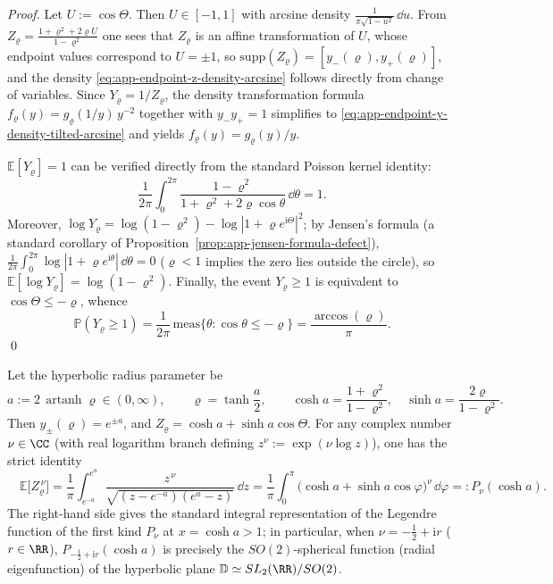 \begin{proof}
Let \(U:=\cos\Theta\). Then \(U\in[-1,1]\) with arcsine density
\(
\frac{1}{\pi\sqrt{1-u^{2}}}\,\dd u
\).
From \(Z_{\varrho}=\frac{1+\varrho^{2}+2\varrho U}{1-\varrho^{2}}\) one sees that \(Z_{\varrho}\) is an affine transformation of \(U\),
whose endpoint values correspond to \(U=\pm 1\), so \(\mathrm{supp}(Z_{\varrho})=[y_{-}(\varrho),y_{+}(\varrho)]\), and the density \eqref{eq:app-endpoint-z-density-arcsine} follows directly from change of variables.
Since \(Y_{\varrho}=1/Z_{\varrho}\), the density transformation formula \(f_{\varrho}(y)=g_{\varrho}(1/y)\,y^{-2}\) together with \(y_{-}y_{+}=1\) simplifies to \eqref{eq:app-endpoint-y-density-tilted-arcsine} and yields \(f_{\varrho}(y)=g_{\varrho}(y)/y\).
\par
\(\mathbb{E}[Y_{\varrho}]=1\) can be verified directly from the standard Poisson kernel identity:
\[
\frac{1}{2\pi}\int_{0}^{2\pi}\frac{1-\varrho^{2}}{1+\varrho^{2}+2\varrho\cos\theta}\,\dd\theta=1.
\]
Moreover,
\(
\log Y_{\varrho}
=\log(1-\varrho^{2})-\log|1+\varrho e^{\mathrm{i}\Theta}|^{2}
\);
by Jensen's formula (a standard corollary of Proposition~\ref{prop:app-jensen-formula-defect}),
\(
\frac{1}{2\pi}\int_{0}^{2\pi}\log|1+\varrho e^{\mathrm{i}\theta}|\,\dd\theta=0
\) (\(\varrho<1\) implies the zero lies outside the circle), so \(\mathbb{E}[\log Y_{\varrho}]=\log(1-\varrho^{2})\).
Finally, the event \(Y_{\varrho}\ge 1\) is equivalent to \(\cos\Theta\le -\varrho\), whence
\[
\mathbb{P}(Y_{\varrho}\ge 1)=\frac{1}{2\pi}\,\mathrm{meas}\{\theta:\cos\theta\le-\varrho\}
=\frac{\arccos(\varrho)}{\pi}.
\]
\qed
\end{proof}

\begin{theorem}\label{thm:app-legendre-moment-timefiber}
Let the hyperbolic radius parameter be
\[
a:=2\,\operatorname{artanh}\varrho\in(0,\infty),
\qquad
\varrho=\tanh\frac{a}{2},
\qquad
\cosh a=\frac{1+\varrho^{2}}{1-\varrho^{2}},
\quad
\sinh a=\frac{2\varrho}{1-\varrho^{2}}.
\]
Then \(y_{\pm}(\varrho)=e^{\pm a}\), and
\(
Z_{\varrho}=\cosh a+\sinh a\cos\Theta
\).
For any complex number \(\nu\in\CC\) (with real logarithm branch defining \(z^{\nu}:=\exp(\nu\log z)\)), one has the strict identity
\begin{equation}\label{eq:app-legendre-moment}
\boxed{\quad
\mathbb{E}\bigl[Z_{\varrho}^{\,\nu}\bigr]
=\frac{1}{\pi}\int_{e^{-a}}^{e^{a}}
\frac{z^{\,\nu}}{\sqrt{(z-e^{-a})(e^{a}-z)}}\,\dd z
=\frac{1}{\pi}\int_{0}^{\pi}\bigl(\cosh a+\sinh a\cos\varphi\bigr)^{\nu}\,\dd\varphi
=:P_{\nu}(\cosh a).
\quad}
\end{equation}
The right-hand side gives the standard integral representation of the Legendre function of the first kind \(P_{\nu}\) at \(x=\cosh a>1\); in particular, when \(\nu=-\tfrac12+\mathrm{i}r\) (\(r\in\RR\)),
\(
P_{-\frac12+\mathrm{i}r}(\cosh a)
\)
is precisely the \(SO(2)\)-spherical function (radial eigenfunction) of the hyperbolic plane \(\mathbb{D}\simeq SL_{2}(\RR)/SO(2)\).
\end{theorem}

